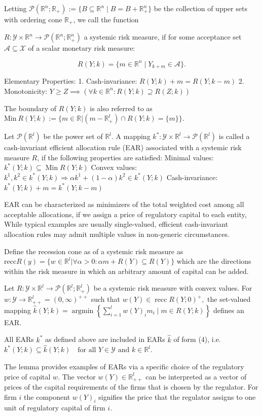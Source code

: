 Letting \(\mathcal{P}(\mathbb{R}^n; \mathbb{R}_+) := \{ B \subseteq \mathbb{R}^n \mid B = B + \mathbb{R}^n_+ \}\) 
be the collection of upper sets with ordering cone \(\mathbb{R}_+\), we call the function 

\(R: \mathcal{Y} \times \mathbb{R}^n \to \mathcal{P}(\mathbb{R}^n; \mathbb{R}_+^n)\)
a systemic risk measure, if for some acceptance set \(\mathcal{A} \subseteq \mathcal{X}\) of a scalar monetary risk measure:

\[ R(Y; k) = \{ m \in \mathbb{R}^n \mid Y_{k+m} \in \mathcal{A} \}. \]

Elementary Properties:
1. Cash-invariance:  \( R(Y; k) + m = R(Y; k - m) \)
2. Monotonicity:  \( Y \geq Z \implies (\forall k \in \mathbb{R}^n: R(Y; k) \supseteq R(Z; k)) \)

The boundary of \( R(Y; k) \) is also referred to as \( \text{Min}\ R(Y;k) := \{m \in \mathbb{R} | (m - \mathbb{R}^l_{+}) \cap R(Y;k) = \{m\}\} \).


Let \(\mathcal{P}(\mathbb{R}^l)\) be the power set of \(\mathbb{R}^l\). A mapping
\(
k^* : \mathcal{Y} \times \mathbb{R}^l \to \mathcal{P}(\mathbb{R}^l)
\)
is called a cash-invariant efficient allocation rule (EAR) associated with a systemic risk measure \(R\), 
if the following properties are satisfied:
Minimal values:
\(
k^*(Y; k) \subseteq \operatorname{Min} R(Y; k)
\)
Convex values:
\(
k^1, k^2 \in k^*(Y; k) \Rightarrow \alpha k^1 + (1 - \alpha) k^2 \in k^*(Y; k)
\)
Cash-invariance:
\(
k^*(Y; k) + m = k^*(Y; k - m)
\)

EAR can be characterized
as minimizers of the total weighted cost among all acceptable allocations, if we assign a price of regulatory capital to each entity,
While typical examples are usually single-valued,
efficient cash-invariant allocation rules may admit multiple values in non-generic circumstances.

Define the recession cone as of a systemic risk measure as 
\( \text{recc} R(y) = \{w \in \mathbb{R}^l | \forall \alpha > 0 : \alpha m + R(Y) \subseteq R(Y) \} \)
which are the directions within the risk measure in which an arbitrary amount of capital can be
added.


Let \( R : \mathcal{Y} \times \mathbb{R}^l \to \mathcal{P}(\mathbb{R}^l; \mathbb{R}^l_+) \) be a systemic risk measure with convex values. 
For \( w : \mathcal{Y} \to \mathbb{R}^l_{++} = (0, \infty)^{++} \) such that
\(
w(Y) \in \operatorname{recc} R(Y;0)^+,
\)
the set-valued mapping
\(
\hat{k}(Y; k) = \operatorname{argmin} \left\{ \sum_{i=1}^{l} w(Y)_i m_i \mid m \in R(Y; k) \right\}
\)
defines an EAR. 

All EARs \( k^* \) as defined above are included in EARs \( \hat{k} \) of form (4), i.e. 
\(
k^*(Y; k) \subseteq \hat{k}(Y; k) \quad \text{for all } Y \in \mathcal{Y} \text{ and } k \in \mathbb{R}^l.
\)

The lemma provides examples of EARs via a specific choice of the regulatory price of capital \( w \).
The vector \( w(Y) \in \mathbb{R}^l_{++} \) can be interpreted as a vector of prices of the
capital requirements of the firms that is chosen by the regulator. For firm \( i \) the component \( w(Y)_i \)
signifies the price that the regulator assigns to one unit of regulatory capital of firm \( i \).
